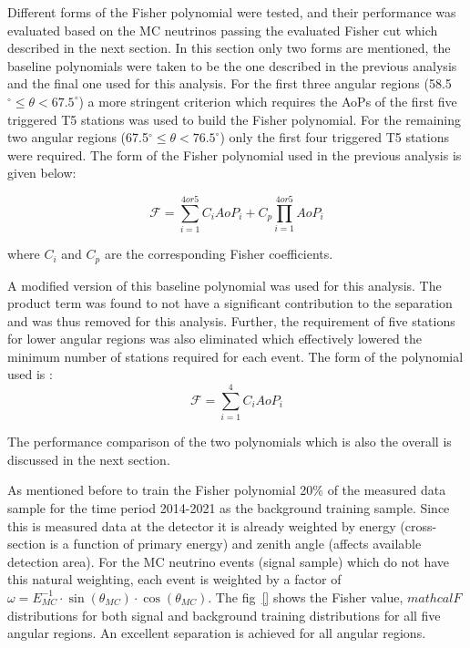 Different forms of the Fisher polynomial were tested, and their performance was evaluated based on the MC neutrinos passing the evaluated Fisher cut which described in the next section. In this section only two forms are mentioned, the baseline polynomials were taken to be the one described in the previous analysis~\cite{gap_note_2013} and the final one used for this analysis. For the first three angular regions (58.5$^\circ \leq \theta < 67.5^\circ$) a more stringent criterion which requires the AoPs of the first five triggered T5 stations was used to build the Fisher polynomial. For the remaining two angular regions (67.5$^\circ \leq \theta < 76.5^\circ$) only the first four triggered T5 stations were required. The form of the Fisher polynomial used in the previous analysis is given below:

\begin{equation}
  \mathcal{F} = \sum_{i=1}^{4or5} C_i AoP_i + C_p \prod_{i=1}^{4or5} AoP_i
\end{equation}

where $C_i$ and $C_p$ are the corresponding Fisher coefficients. 

A modified version of this baseline polynomial was used for this analysis. The product term was found to not have a significant contribution to the separation and was thus removed for this analysis. Further, the requirement of five stations for lower angular regions was also eliminated which effectively lowered the minimum number of stations required for each event. The form of the polynomial used is : 
\begin{equation}
  \label{eq:fisher_poly_new}
  \mathcal{F} = \sum_{i=1}^{4} C_i AoP_i
\end{equation}

The performance comparison of the two polynomials which is also the overall is discussed in the next section.

As mentioned before to train the Fisher polynomial 20\% of the measured data sample for the time period 2014-2021 as the background training sample. Since this is measured data at the detector it is already weighted by energy (cross-section is a function of primary energy) and zenith angle (affects available detection area). For the MC neutrino events (signal sample) which do not have this natural weighting, each event is weighted by a factor of $\omega = E_{MC}^{-1} \cdot \sin(\theta_{MC}) \cdot \cos(\theta_{MC})$. The fig~\ref{} shows the Fisher value, $mathcal{F}$ distributions for both signal and background training distributions for all five angular regions. An excellent separation is achieved for all angular regions. 

